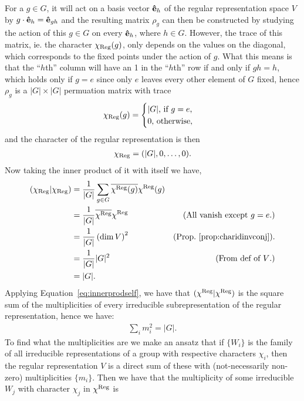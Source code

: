For a $g \in G$, it will act on a basis vector $\mathbf{\hat{e}}_h$ of the regular representation space $V$ by $g \cdot \mathbf{\hat{e}}_{h} = \mathbf{\hat{e}}_{gh}$ and the resulting matrix $\rho_g$ can then be constructed by studying the action of this $g \in G$ on every $\mathbf{\hat{e}}_h$, where $h \in G$. However, the trace of this matrix, ie. the character $\chi_{\text{Reg}}(g)$, only depends on the values on the diagonal, which corresponds to the fixed points under the action of $g$. What this means is that the ``$h$th'' column will have an 1 in the ``$h$th'' row if and only if $gh = h$, which holds only if $g = e$ since only $e$ leaves every other element of $G$ fixed, hence $\rho_g$ is a $|G| \times |G|$ permuation matrix with trace
\begin{align}\label{eq:regcharacter}
	\chi_{\text{Reg}}(g) = \begin{cases}
		|G| \text{, if $g = e$,} \\
		0 \text{, otherwise,}
	\end{cases}
\end{align}
and the character of the regular representation is then
\begin{align*}
	\chi_{\text{Reg}} = (|G|, 0, \dots, 0).
\end{align*}
Now taking the inner product of it with itself we have,
\begin{align*}
	(\chi_{\text{Reg}}|\chi_{\text{Reg}}) &= \frac{1}{|G|} \sum_{g \in G} \overline{\chi^{\text{Reg}}(g)}\chi^{\text{Reg}}(g) \\
	&=  \frac{1}{|G|}  \overline{\chi^{\text{Reg}}}\chi^{\text{Reg}} & \text{(All vanish except $g=e$.)} \\
	&= \frac{1}{|G|} \left(\dim V \right)^2  & \text{(Prop.~\ref{prop:charidinvconj}).}\\
	&= \frac{1}{|G|}|G|^2 & \text{(From def of $V$.)} \\
	&= |G|.
\end{align*}
Applying Equation~\ref{eq:innerprodself}, we have that $(\chi^{\text{Reg}}|\chi^{\text{Reg}}) $ is the square sum of the multiplicities of every irreducible subrepresentation of the regular representation, hence we have:
\begin{align}\label{eq:sqsummult}
	\sum_i m_i^2 = |G|.
\end{align}
To find what the multiplicities are we make an ansatz that if $\{W_i\}$ is the family of all irreducible representations of a group with respective characters $\chi_i$, then the regular representation $V$ is a direct sum of these with (not-necessarily non-zero) multiplicities $\{m_i\}$. Then we have that the multiplicity of some irreducible $W_j$ with character $\chi_j$ in $\chi^{\text{Reg}}$ is
